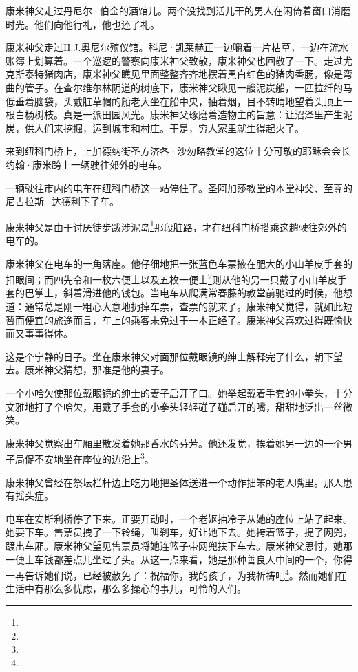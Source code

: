\par 康米神父走过丹尼尔·伯金的酒馆儿。两个没找到活儿干的男人在闲倚着窗口消磨时光。他们向他行礼，他也还了礼。
\par 康米神父走过H.J.奥尼尔殡仪馆。科尼·凯莱赫正一边嚼着一片枯草，一边在流水账簿上划算着。一个巡逻的警察向康米神父致敬，康米神父也回敬了一下。走过尤克斯泰特猪肉店，康米神父瞧见里面整整齐齐地摆着黑白红色的猪肉香肠，像是弯曲的管子。在查尔维尔林阴道的树底下，康米神父瞅见一艘泥炭船，一匹拉纤的马低垂着脑袋，头戴脏草帽的船老大坐在船中央，抽着烟，目不转睛地望着头顶上一根白杨树枝。真是一派田园风光。康米神父琢磨着造物主的旨意：让沼泽里产生泥炭，供人们来挖掘，运到城市和村庄。于是，穷人家里就生得起火了。
\par 来到纽科门桥上，上加德纳街圣方济各·沙勿略教堂的这位十分可敬的耶稣会会长约翰·康米跨上一辆驶往郊外的电车。
\par 一辆驶往市内的电车在纽科门桥这一站停住了。圣阿加莎教堂的本堂神父、至尊的尼古拉斯·达德利下了车。
\par 康米神父是由于讨厌徒步跋涉泥岛\footnote{}那段脏路，才在纽科门桥搭乘这趟驶往郊外的电车的。
\par 康米神父在电车的一角落座。他仔细地把一张蓝色车票掖在肥大的小山羊皮手套的扣眼间；而四先令和一枚六便士以及五枚一便士\footnote{}则从他的另一只戴了小山羊皮手套的巴掌上，斜着滑进他的钱包。当电车从爬满常春藤的教堂前驰过的时候，他想道：通常总是刚一粗心大意地扔掉车票，查票的就来了。康米神父觉得，就如此短暂而便宜的旅途而言，车上的乘客未免过于一本正经了。康米神父喜欢过得既愉快而又事事得体。
\par 这是个宁静的日子。坐在康米神父对面那位戴眼镜的绅士解释完了什么，朝下望去。康米神父猜想，那准是他的妻子。
\par 一个小哈欠使那位戴眼镜的绅士的妻子启开了口。她举起戴着手套的小拳头，十分文雅地打了个哈欠，用戴了手套的小拳头轻轻碰了碰启开的嘴，甜甜地泛出一丝微笑。
\par 康米神父觉察出车厢里散发着她那香水的芬芳。他还发觉，挨着她另一边的一个男子局促不安地坐在座位的边沿上\footnote{}。
\par 康米神父曾经在祭坛栏杆边上吃力地把圣体送进一个动作拙笨的老人嘴里。那人患有摇头症。
\par 电车在安斯利桥停了下来。正要开动时，一个老妪抽冷子从她的座位上站了起来。她要下车。售票员拽了一下铃绳，叫刹车，好让她下去。她挎着篮子，提了网兜，踱出车厢。康米神父望见售票员将她连篮子带网兜扶下车去。康米神父思忖，她那一便士车钱都差点儿坐过了头。从这一点来看，她是那种善良人中间的一个，你得一再告诉她们说，已经被赦免了：祝福你，我的孩子，为我祈祷吧\footnote{}。然而她们在生活中有那么多忧虑，那么多操心的事儿，可怜的人们。
